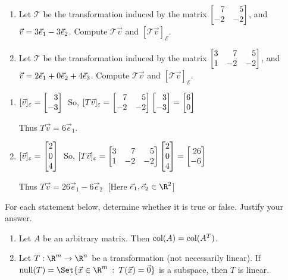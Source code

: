 \begin{exercises}
\begin{problist}
		\prob
		\begin{enumerate}
			\item Let $\mathcal T$ be the transformation induced by the matrix
				$\mat{7&5\\-2&-2}$, and $\vec v=3{\vec e_1}-3{\vec e_2}$. Compute $\mathcal
				T\vec v$ and $[\mathcal T\vec v]_{\mathcal E}$.

			\item Let $\mathcal T$ be the transformation induced by the matrix
				$\mat{3&7&5\\1&-2&-2}$, and $\vec v=2{\vec e_1}+0{\vec e_2}+4{\vec e_3}$.
				Compute $\mathcal T\vec v$ and $[\mathcal T\vec v]_{\mathcal
				E}$.
		\end{enumerate}


		\begin{solution}

			\begin{enumerate}
				\item $[\vec v]_{\varepsilon} = \mat{3\\-3}\;$ So, $[T\vec
					v]_{\varepsilon} = \mat{7&5\\-2&-2}\mat{3\\-3}=\mat{6\\0}$

					Thus $T\vec v =6\vec e_{1}.$

				\item $[\vec v]_{\varepsilon} = \mat{2\\0\\4}\;$ So, $[T\vec
					v]_{\varepsilon} = \mat{3&7&5\\1&-2&-2}\mat{2\\0\\4}=\mat{26\\-6}$

					Thus $T\vec v =26\vec e_{1}-6\vec e_{2}\;$ [Here $\vec
					e_{1}, \vec e_{2}\in \R^{2}$]
			\end{enumerate}
		\end{solution}

		\prob For each statement below, determine whether it is true or false.
		Justify your answer.
		\begin{enumerate}
			\item Let $A$ be an arbitrary matrix. Then $\operatorname{col}(A)=\operatorname{col}(A^{T})$.

			\item Let $T:\R^{m}\to\R^{n}$ be a transformation (not necessarily
				linear). If $\Null(T)=\Set{\vec x\in\R^m \given T(\vec x)=\vec
				0}$ is a subspace, then $T$ is linear.


\end{enumerate}
\end{problist}
\end{exercises}

